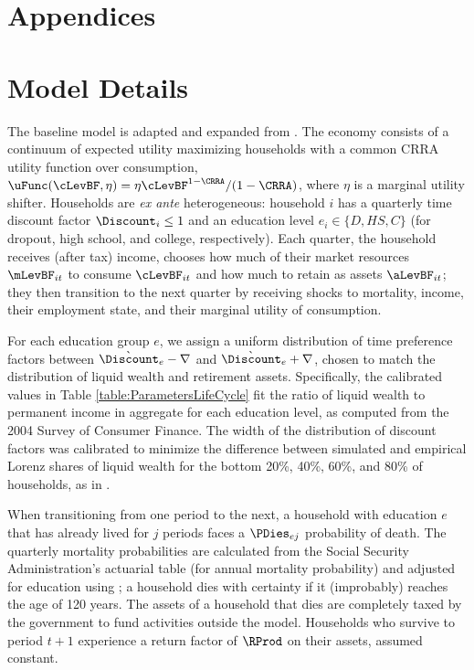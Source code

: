 \documentclass[./ConsumptionResponse]{subfiles}
\begin{document}
\pagestyle{empty}

\appendix
\section*{Appendices}

\section{Model Details} \label{model_details}

The baseline model is adapted and expanded from \cite{cstwMPC}.
The economy consists of a continuum of expected utility maximizing households with a common CRRA utility function over consumption, $\uFunc(\cLevBF,\eta) = \eta \cLevBF^{1-\CRRA}/(1-\CRRA)$, where $\eta$ is a marginal utility shifter.
Households are \textit{ex ante} heterogeneous: household $i$ has a quarterly time discount factor $\Discount_i \leq 1$ and an education level $e_i \in \{D,HS,C\}$ (for dropout, high school, and college, respectively).
Each quarter, the household receives (after tax) income, chooses how much of their market resources $\mLevBF_{it}$ to consume $\cLevBF_{it}$ and how much to retain as assets $\aLevBF_{it}$; they then transition to the next quarter by receiving shocks to mortality, income, their employment state, and their marginal utility of consumption.

For each education group $e$, we assign a uniform distribution of time preference factors between $\grave{\Discount}_e-\nabla$ and $\grave{\Discount}_e+\nabla$, chosen to match the distribution of liquid wealth and retirement assets.
Specifically, the calibrated values in Table \ref{table:ParametersLifeCycle} fit the ratio of liquid wealth to permanent income in aggregate for each education level, as computed from the 2004 Survey of Consumer Finance.
The width of the distribution of discount factors was calibrated to minimize the difference between simulated and empirical Lorenz shares of liquid wealth for the bottom 20\%, 40\%, 60\%, and 80\% of households, as in \cite{cstwMPC}.

When transitioning from one period to the next, a household with education $e$ that has already lived for $j$ periods faces a $\PDies_{ej}$ probability of death.
The quarterly mortality probabilities are calculated from the Social Security Administration's actuarial table (for annual mortality probability) and adjusted for education using \cite{BrownLiebmanPollet}; a household dies with certainty if it (improbably) reaches the age of 120 years.
The assets of a household that dies are completely taxed by the government to fund activities outside the model.
Households who survive to period $t+1$ experience a return factor of $\RProd$ on their assets, assumed constant.
\end{document}
